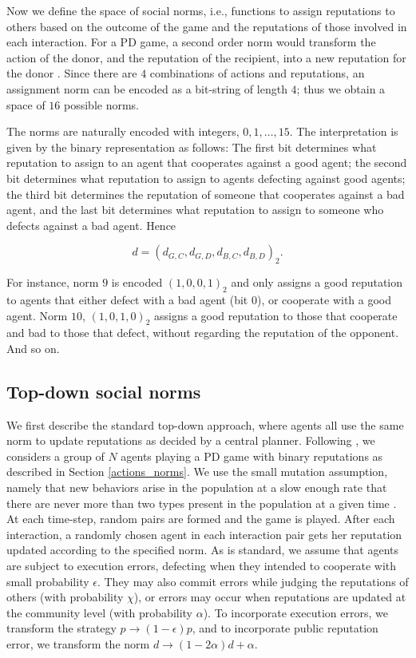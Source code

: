 \documentclass[sigconf]{aamas}  %
\begin{document}
Now we define the space of social norms, i.e., functions to assign reputations to others based on the outcome of the game and the reputations of those involved in each interaction. For a PD game, a second order norm would transform the action of the donor, and the reputation of the recipient, into a new reputation for the donor \cite{Santos2016}. Since there are $4$ combinations of actions and reputations, an assignment norm can be encoded as a bit-string of length $4$; thus we obtain a space of $16$ possible norms. 

The norms are naturally encoded with integers, $0, 1, \dots, 15$. The interpretation is given by the binary representation as follows: The first bit determines what reputation to assign to an agent that cooperates against a good agent; the second bit determines what reputation to assign to agents defecting against good agents; the third bit determines the reputation of someone that cooperates against a bad agent, and the last bit determines what reputation to assign to someone who defects against a bad agent. Hence 

$$d = (d_{G,C},d_{G,D},d_{B,C},d_{B,D})_2 .$$ 

\noindent For instance, norm $9$ is encoded $(1, 0, 0, 1)_2$ and only assigns a good reputation to agents that either defect with a bad agent (bit $0$), or cooperate with a good agent. Norm $10$, $(1, 0, 1, 0)_2$ assigns a good reputation to those that cooperate and bad to those that defect, without regarding the reputation of the opponent. And so on.

\subsection{Top-down social norms}
 
 We first describe the standard top-down approach, where agents all use the same norm to update reputations as decided by a central planner.  Following \cite{Santos2016},  we considers a group of $N$ agents  playing a PD game with binary reputations as described in Section \ref{actions_norms}. We use the small mutation assumption, namely that new behaviors arise in the population at a slow enough rate that there are never more than two types present in the population at a given time \cite{fudenberg:JET:2006}. At each time-step, random pairs are formed and the game is played. After each interaction, a randomly chosen agent in each interaction pair gets her reputation updated according to the specified norm.  As is standard, we assume that agents are subject to execution errors,  defecting when they intended to cooperate with small probability $\epsilon$. They may also commit errors while judging the reputations of others (with probability $\chi$), or errors may occur when reputations are updated at the community level (with probability $\alpha$). To incorporate execution errors, we transform the strategy $p \to (1-\epsilon)p$, and to incorporate public reputation error, we transform the norm $d \to (1-2\alpha)d + \alpha$.
 
\end{document}
